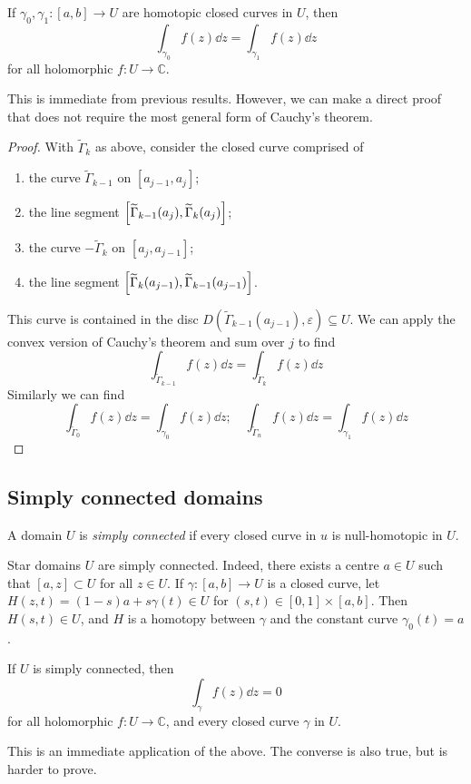 \begin{corollary}
	If \( \gamma_0, \gamma_1 \colon [a,b] \to U \) are homotopic closed curves in \( U \), then
	\[
		\int_{\gamma_0} f(z) \dd{z} = \int_{\gamma_1} f(z) \dd{z}
	\]
	for all holomorphic \( f \colon U \to \mathbb C \).
\end{corollary}
This is immediate from previous results.
However, we can make a direct proof that does not require the most general form of Cauchy's theorem.
\begin{proof}
	With \( \widetilde \Gamma_k \) as above, consider the closed curve comprised of
	\begin{enumerate}
		\item the curve \( \widetilde \Gamma_{k-1} \) on \( [a_{j-1}, a_j] \);
		\item the line segment \( \qty[\widetilde \Gamma_{k-1}(a_j), \widetilde \Gamma_k(a_j)] \);
		\item the curve \( - \widetilde \Gamma_{k} \) on \( [a_j, a_{j-1}] \);
		\item the line segment \( \qty[\widetilde \Gamma_k(a_{j-1}), \widetilde \Gamma_{k-1}(a_{j-1})] \).
	\end{enumerate}
	This curve is contained in the disc \( D(\widetilde \Gamma_{k-1}(a_{j-1}), \varepsilon) \subseteq U \).
	We can apply the convex version of Cauchy's theorem and sum over \( j \) to find
	\[
		\int_{\widetilde \Gamma_{k-1}} f(z) \dd{z} = \int_{\widetilde \Gamma_k} f(z) \dd{z}
	\]
	Similarly we can find
	\[
		\int_{\widetilde \Gamma_0} f(z) \dd{z} = \int_{\gamma_0} f(z) \dd{z};\quad \int_{\widetilde \Gamma_n} f(z) \dd{z} = \int_{\gamma_1} f(z) \dd{z}
	\]
\end{proof}

\subsection{Simply connected domains}
\begin{definition}
	A domain \( U \) is \textit{simply connected} if every closed curve in \( u \) is null-homotopic in \( U \).
\end{definition}
Star domains \( U \) are simply connected.
Indeed, there exists a centre \( a \in U \) such that \( [a,z] \subset U \) for all \( z \in U \).
If \( \gamma \colon [a,b] \to U \) is a closed curve, let \( H(z,t) = (1-s)a + s\gamma(t) \in U \) for \( (s,t) \in [0,1] \times [a,b] \).
Then \( H(s,t) \in U \), and \( H \) is a homotopy between \( \gamma \) and the constant curve \( \gamma_0(t) = a \).
\begin{theorem}
	If \( U \) is simply connected, then
	\[
		\int_\gamma f(z) \dd{z} = 0
	\]
	for all holomorphic \( f \colon U \to \mathbb C \), and every closed curve \( \gamma \) in \( U \).
\end{theorem}
This is an immediate application of the above.
The converse is also true, but is harder to prove.

